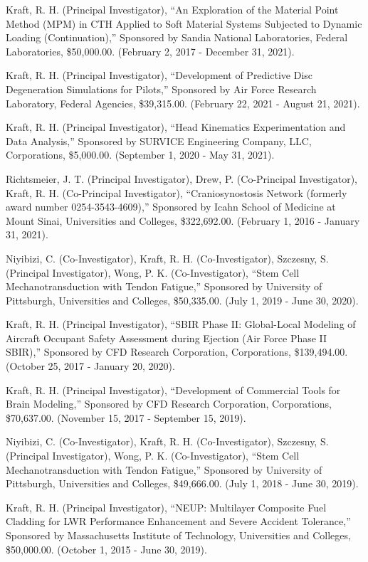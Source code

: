 \documentclass[11pt]{article}
\begin{document}
Kraft, R. 
H. 
(Principal Investigator), ``An Exploration of the Material
Point Method (MPM) in CTH Applied to Soft Material Systems Subjected to
Dynamic Loading (Continuation),'' Sponsored by Sandia National
Laboratories, Federal Laboratories, \$50,000.00. 
(February 2, 2017 -
December 31, 2021).

Kraft, R. 
H. 
(Principal Investigator), ``Development of Predictive Disc
Degeneration Simulations for Pilots,'' Sponsored by Air Force Research
Laboratory, Federal Agencies, \$39,315.00. 
(February 22, 2021 - August
21, 2021).

Kraft, R. 
H. 
(Principal Investigator), ``Head Kinematics Experimentation
and Data Analysis,'' Sponsored by SURVICE Engineering Company, LLC,
Corporations, \$5,000.00. 
(September 1, 2020 - May 31, 2021).

Richtsmeier, J. 
T. 
(Principal Investigator), Drew, P. 
(Co-Principal
Investigator), Kraft, R. 
H. 
(Co-Principal Investigator),
``Craniosynostosis Network (formerly award number 0254-3543-4609),''
Sponsored by Icahn School of Medicine at Mount Sinai, Universities and
Colleges, \$322,692.00. 
(February 1, 2016 - January 31, 2021).

Niyibizi, C. 
(Co-Investigator), Kraft, R. 
H. 
(Co-Investigator),
Szczesny, S. 
(Principal Investigator), Wong, P. 
K. 
(Co-Investigator),
``Stem Cell Mechanotransduction with Tendon Fatigue,'' Sponsored by
University of Pittsburgh, Universities and Colleges, \$50,335.00. 
(July
1, 2019 - June 30, 2020).

Kraft, R. 
H. 
(Principal Investigator), ``SBIR Phase II: Global-Local
Modeling of Aircraft Occupant Safety Assessment during Ejection (Air
Force Phase II SBIR),'' Sponsored by CFD Research Corporation,
Corporations, \$139,494.00. 
(October 25, 2017 - January 20, 2020).

Kraft, R. 
H. 
(Principal Investigator), ``Development of Commercial Tools
for Brain Modeling,'' Sponsored by CFD Research Corporation,
Corporations, \$70,637.00. 
(November 15, 2017 - September 15, 2019).

Niyibizi, C. 
(Co-Investigator), Kraft, R. 
H. 
(Co-Investigator),
Szczesny, S. 
(Principal Investigator), Wong, P. 
K. 
(Co-Investigator),
``Stem Cell Mechanotransduction with Tendon Fatigue,'' Sponsored by
University of Pittsburgh, Universities and Colleges, \$49,666.00. 
(July
1, 2018 - June 30, 2019).

Kraft, R. 
H. 
(Principal Investigator), ``NEUP: Multilayer Composite Fuel
Cladding for LWR Performance Enhancement and Severe Accident Tolerance,''
Sponsored by Massachusetts Institute of Technology, Universities and
Colleges, \$50,000.00. 
(October 1, 2015 - June 30, 2019).
\end{document}
